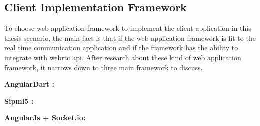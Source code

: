 \subsection{Client Implementation Framework}

\noindent To choose web application framework to implement the client application in this thesis scenario, the main fact is that if the web  application framework is fit to the real time communication application and if the framework has the ability to integrate with \gls{webrtc} \gls{api}. After research about these kind of web application framework, it narrows down to three main framework to discuss.

\textbf{AngularDart :}

\par

\textbf{Sipml5 :}

\par

\textbf{AngularJs + Socket.io: }

\par